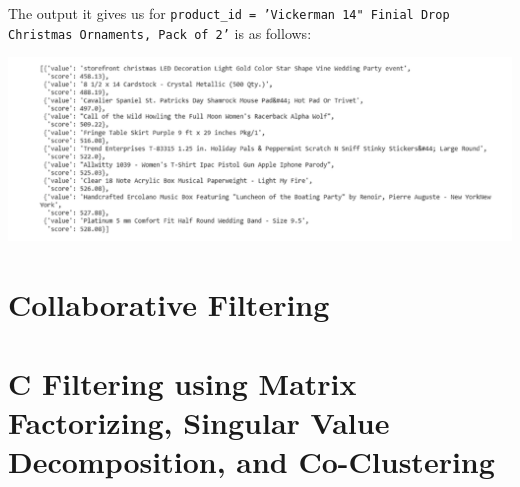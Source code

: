 \documentclass{article}
\begin{document}
The output it gives us for \texttt{product\_id = 'Vickerman 14" Finial Drop Christmas Ornaments, Pack of 2'} is as follows:

\begin{center}
\includegraphics[scale=0.35]{01.png}
\end{center}

\section{Collaborative Filtering}
\section{C Filtering using Matrix Factorizing, Singular Value Decomposition, and Co-Clustering}
\end{document}
